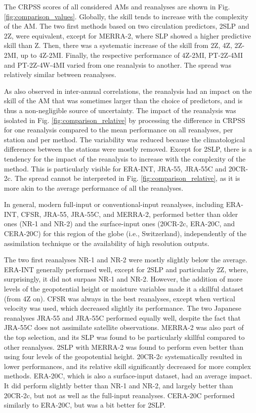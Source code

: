\documentclass{ametsoc}
\begin{document}
	The CRPSS scores of all considered AMs and reanalyses are shown in Fig. \ref{fig:comparison_values}. Globally, the skill tends to increase with the complexity of the AM. The two first methods based on two circulation predictors, 2SLP and 2Z, were equivalent, except for MERRA-2, where SLP showed a higher predictive skill than Z. Then, there was a systematic increase of the skill from 2Z, 4Z, 2Z-2MI, up to 4Z-2MI. Finally, the respective performance of 4Z-2MI, PT-2Z-4MI and PT-2Z-4W-4MI varied from one reanalysis to another. The spread was relatively similar between reanalyses.
	
	As \citet{Dayon2015} also observed in inter-annual correlations, the reanalysis had an impact on the skill of the AM that was sometimes larger than the choice of predictors, and is thus a non-negligible source of uncertainty. The impact of the reanalysis was isolated in Fig. \ref{fig:comparison_relative} by processing the difference in CRPSS for one reanalysis compared to the mean performance on all reanalyses, per station and per method. The variability was reduced because the climatological differences between the stations were mostly removed. Except for 2SLP, there is a tendency for the impact of the reanalysis to increase with the complexity of the method. This is particularly visible for ERA-INT, JRA-55, JRA-55C and 20CR-2c. The spread cannot be interpreted in Fig. \ref{fig:comparison_relative}, as it is more akin to the average performance of all the reanalyses.
	
	In general, modern full-input or conventional-input reanalyses, including ERA-INT, CFSR, JRA-55, JRA-55C, and MERRA-2, performed better than older ones (NR-1 and NR-2) and the surface-input ones (20CR-2c, ERA-20C, and CERA-20C) for this region of the globe (i.e., Switzerland), independently of the assimilation technique or the availability of high resolution outputs.
	
	The two first reanalyses NR-1 and NR-2 were mostly slightly below the average. ERA-INT generally performed well, except for 2SLP and particularly 2Z, where, surprisingly, it did not surpass NR-1 and NR-2. However, the addition of more levels of the geopotential height or moisture variables made it a skillful dataset (from 4Z on). CFSR was always in the best reanalyses, except when vertical velocity was used, which decreased slightly its performance. The two Japanese reanalyses JRA-55 and JRA-55C performed equally well, despite the fact that JRA-55C does not assimilate satellite observations. MERRA-2 was also part of the top selection, and its SLP was found to be particularly skillful compared to other reanalyses. 2SLP with MERRA-2 was found to perform even better than using four levels of the geopotential height. 20CR-2c systematically resulted in lower performances, and its relative skill significantly decreased for more complex methods. ERA-20C, which is also a surface-input dataset, had an average impact. It did perform slightly better than NR-1 and NR-2, and largely better than 20CR-2c, but not as well as the full-input reanalyses. CERA-20C performed similarly to ERA-20C, but was a bit better for 2SLP.
	
\end{document}
